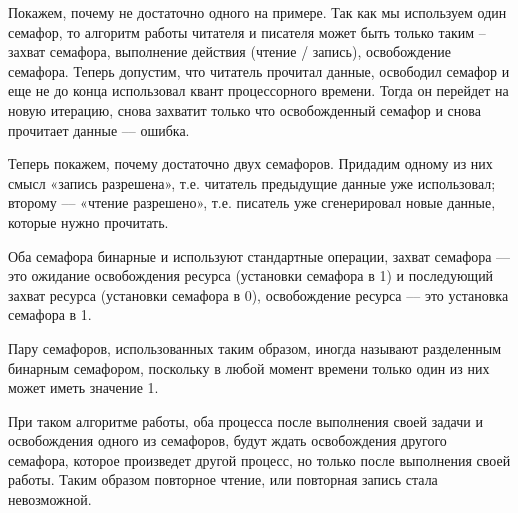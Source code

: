 \documentclass[a4paper]{article}
\begin{document}
	Покажем, почему не достаточно одного на примере. Так как мы используем один семафор, то алгоритм работы читателя и писателя может быть только таким – захват семафора, выполнение действия (чтение / запись), освобождение семафора. Теперь допустим, что читатель прочитал данные, освободил семафор и еще не до конца использовал квант процессорного времени. Тогда он перейдет на новую итерацию, снова захватит только что освобожденный семафор и снова прочитает данные --– ошибка.
	
	Теперь покажем, почему достаточно двух семафоров. Придадим одному из них смысл «запись разрешена», т.е. читатель предыдущие данные уже использовал; второму –-- «чтение разрешено», т.е. писатель уже сгенерировал новые данные, которые нужно прочитать.
	
	Оба семафора бинарные и используют стандартные операции, захват семафора --– это ожидание освобождения ресурса (установки семафора в 1) и последующий захват ресурса (установки семафора в 0), освобождение ресурса --– это установка семафора в 1.

	Пару семафоров, использованных таким образом, иногда называют разделенным бинарным семафором, поскольку в любой момент времени только один из них может иметь значение 1.
	
	При таком алгоритме работы, оба процесса после выполнения своей задачи и освобождения одного из семафоров, будут ждать освобождения другого семафора, которое произведет другой процесс, но только после выполнения своей работы. Таким образом повторное чтение, или повторная запись стала невозможной.
	
\end{document}
